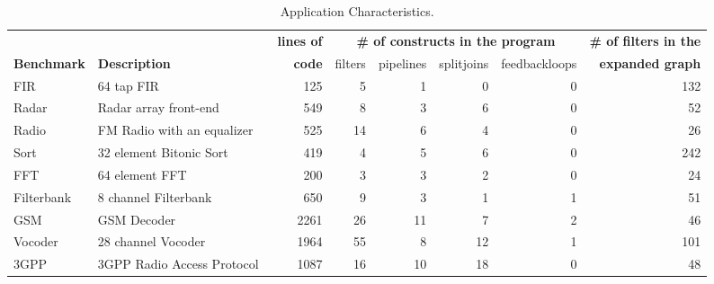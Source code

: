 \begin{table*}[!t]
\begin{center}
\scriptsize
\begin{tabular}{|l|l||r||r|r|r|r||r||} \hline
 & & {\bf lines of} & \multicolumn{4}{|c||}{\bf \# of constructs in the program} & {\bf \# of filters in the} \\ \cline{4-7}
{\bf Benchmark} & {\bf Description} & {\bf code} & filters & pipelines & splitjoins & feedbackloops & {\bf expanded graph}
\\
\hline \hline
FIR & 64 tap FIR & 
125 & 5 & 1 & 0 & 0 & 132
\\ \hline
Radar & Radar array front-end~\cite{pca} & 
549 & 8 & 3 & 6 & 0 & 52
\\ \hline
Radio & FM Radio with an equalizer & 
525& 14 & 6 & 4 & 0 & 26
\\ \hline
Sort & 32 element Bitonic Sort & 
419 & 4 & 5 & 6 & 0 & 242
\\  \hline
FFT & 64 element FFT & 
200 & 3 & 3 & 2 & 0 & 24
\\  \hline
Filterbank & 8 channel Filterbank & 
650 & 9 & 3 & 1 & 1 & 51
\\  \hline
GSM & GSM Decoder & 
2261 & 26 & 11 & 7 & 2 & 46
\\ \hline
Vocoder & 28 channel Vocoder~\cite{seneff80} &  
1964 & 55 & 8 & 12 & 1 & 101
\\ \hline
3GPP & 3GPP Radio Access Protocol~\cite{3gpp} &  
1087 & 16 & 10 & 18 & 0 & 48
\\ \hline
\hline
\end{tabular}
\caption{\protect\small Application Characteristics.}
\label{tab:benchmarks}
\end{center}
\end{table*}

